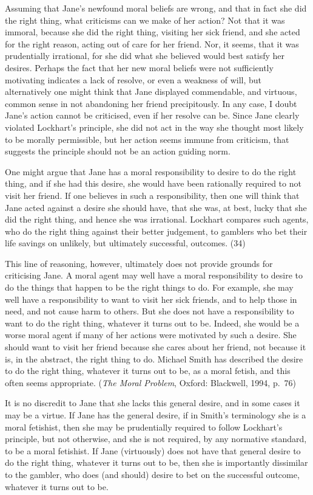 \documentclass[
  11pt,
  letterpaper,
  DIV=11,
  numbers=noendperiod,
  twoside]{scrartcl}
\begin{document}
Assuming that Jane's newfound moral beliefs are wrong, and that in fact
she did the right thing, what criticisms can we make of her action? Not
that it was immoral, because she did the right thing, visiting her sick
friend, and she acted for the right reason, acting out of care for her
friend. Nor, it seems, that it was prudentially irrational, for she did
what she believed would best satisfy her desires. Perhaps the fact that
her new moral beliefs were not sufficiently motivating indicates a lack
of resolve, or even a weakness of will, but alternatively one might
think that Jane displayed commendable, and virtuous, common sense in not
abandoning her friend precipitously. In any case, I doubt Jane's action
cannot be criticised, even if her resolve can be. Since Jane clearly
violated Lockhart's principle, she did not act in the way she thought
most likely to be morally permissible, but her action seems immune from
criticism, that suggests the principle should not be an action guiding
norm.

One might argue that Jane has a moral responsibility to desire to do the
right thing, and if she had this desire, she would have been rationally
required to not visit her friend. If one believes in such a
responsibility, then one will think that Jane acted against a desire she
should have, that she was, at best, lucky that she did the right thing,
and hence she was irrational. Lockhart compares such agents, who do the
right thing against their better judgement, to gamblers who bet their
life savings on unlikely, but ultimately successful, outcomes. (34)

This line of reasoning, however, ultimately does not provide grounds for
criticising Jane. A moral agent may well have a moral responsibility to
desire to do the things that happen to be the right things to do. For
example, she may well have a responsibility to want to visit her sick
friends, and to help those in need, and not cause harm to others. But
she does not have a responsibility to want to do the right thing,
whatever it turns out to be. Indeed, she would be a worse moral agent if
many of her actions were motivated by such a desire. She should want to
visit her friend because she cares about her friend, not because it is,
in the abstract, the right thing to do. Michael Smith has described the
desire to do the right thing, whatever it turns out to be, as a moral
fetish, and this often seems appropriate. (\emph{The Moral Problem},
Oxford: Blackwell, 1994, p.~76)

It is no discredit to Jane that she lacks this general desire, and in
some cases it may be a virtue. If Jane has the general desire, if in
Smith's terminology she is a moral fetishist, then she may be
prudentially required to follow Lockhart's principle, but not otherwise,
and she is not required, by any normative standard, to be a moral
fetishist. If Jane (virtuously) does not have that general desire to do
the right thing, whatever it turns out to be, then she is importantly
dissimilar to the gambler, who does (and should) desire to bet on the
successful outcome, whatever it turns out to be.
\end{document}
